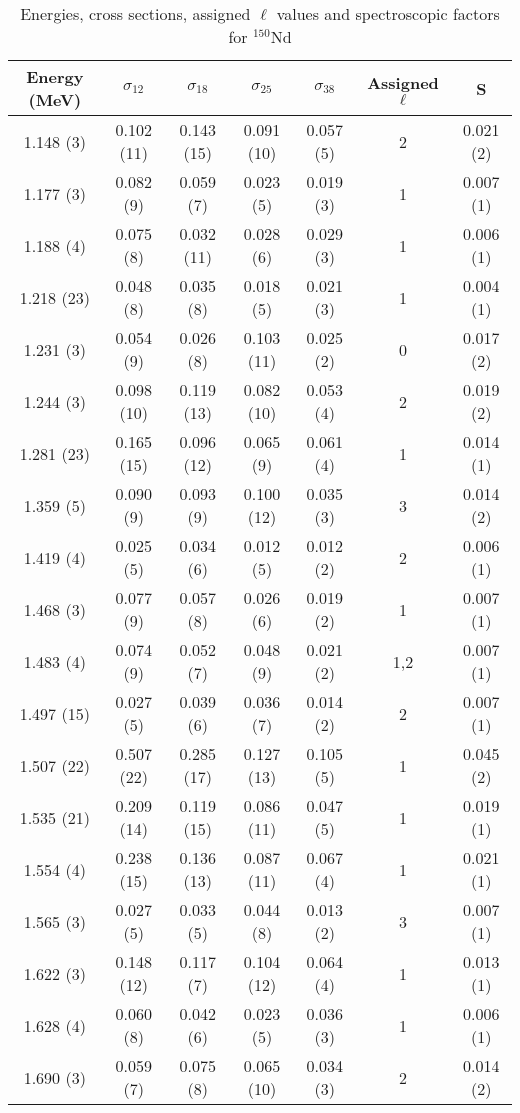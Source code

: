 \begin{table}
\caption{Energies, cross sections, assigned $\ell$ values and spectroscopic factors for $^{150}$Nd}
\begin{tabular}{c c c c c c c}
\hline \hline
Energy (MeV) & $\sigma_{12}$ & $\sigma_{18}$ & $\sigma_{25}$ & $\sigma_{38}$ & Assigned $\ell$ & S\\
\hline \hline
1.148 (3) & 0.102 (11) & 0.143 (15) & 0.091 (10) & 0.057 (5) & 2 & 0.021 (2) \\
1.177 (3) & 0.082 (9) & 0.059 (7) & 0.023 (5) & 0.019 (3) & 1 & 0.007 (1) \\
1.188 (4) & 0.075 (8) & 0.032 (11) & 0.028 (6) & 0.029 (3) & 1 & 0.006 (1) \\
1.218 (23) & 0.048 (8) & 0.035 (8) & 0.018 (5) & 0.021 (3) & 1 & 0.004 (1) \\
1.231 (3) & 0.054 (9) & 0.026 (8) & 0.103 (11) & 0.025 (2) & 0 & 0.017 (2) \\
1.244 (3) & 0.098 (10) & 0.119 (13) & 0.082 (10) & 0.053 (4) & 2 & 0.019 (2) \\
1.281 (23) & 0.165 (15) & 0.096 (12) & 0.065 (9) & 0.061 (4) & 1 & 0.014 (1) \\
1.359 (5) & 0.090 (9) & 0.093 (9) & 0.100 (12) & 0.035 (3) & 3 & 0.014 (2) \\
1.419 (4) & 0.025 (5) & 0.034 (6) & 0.012 (5) & 0.012 (2) & 2 & 0.006 (1) \\
1.468 (3) & 0.077 (9) & 0.057 (8) & 0.026 (6) & 0.019 (2) & 1 & 0.007 (1) \\
1.483 (4) & 0.074 (9) & 0.052 (7) & 0.048 (9) & 0.021 (2) & 1,2 & 0.007 (1) \\
1.497 (15) & 0.027 (5) & 0.039 (6) & 0.036 (7) & 0.014 (2) & 2 & 0.007 (1) \\
1.507 (22) & 0.507 (22) & 0.285 (17) & 0.127 (13) & 0.105 (5) & 1 & 0.045 (2) \\
1.535 (21) & 0.209 (14) & 0.119 (15) & 0.086 (11) & 0.047 (5) & 1 & 0.019 (1) \\
1.554 (4) & 0.238 (15) & 0.136 (13) & 0.087 (11) & 0.067 (4) & 1 & 0.021 (1) \\
1.565 (3) & 0.027 (5) & 0.033 (5) & 0.044 (8) & 0.013 (2) & 3 & 0.007 (1) \\
1.622 (3) & 0.148 (12) & 0.117 (7) & 0.104 (12) & 0.064 (4) & 1 & 0.013 (1) \\
1.628 (4) & 0.060 (8) & 0.042 (6) & 0.023 (5) & 0.036 (3) & 1 & 0.006 (1) \\
1.690 (3) & 0.059 (7) & 0.075 (8) & 0.065 (10) & 0.034 (3) & 2 & 0.014 (2) \\

\end{tabular}
\end{table}
